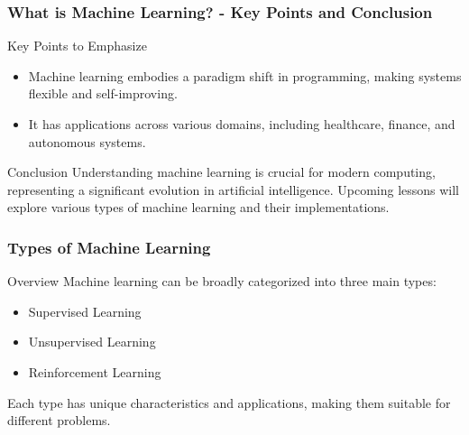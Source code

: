 \documentclass[aspectratio=169]{beamer}
\begin{document}
\begin{frame}[fragile]
    \frametitle{What is Machine Learning? - Key Points and Conclusion}
    \begin{block}{Key Points to Emphasize}
        \begin{itemize}
            \item Machine learning embodies a paradigm shift in programming, making systems flexible and self-improving.
            \item It has applications across various domains, including healthcare, finance, and autonomous systems.
        \end{itemize}
    \end{block}
    
    \begin{block}{Conclusion}
        Understanding machine learning is crucial for modern computing, representing a significant evolution in artificial intelligence. Upcoming lessons will explore various types of machine learning and their implementations.
    \end{block}
\end{frame}

\begin{frame}[fragile]
    \frametitle{Types of Machine Learning}
    \begin{block}{Overview}
        Machine learning can be broadly categorized into three main types:
        \begin{itemize}
            \item Supervised Learning
            \item Unsupervised Learning
            \item Reinforcement Learning
        \end{itemize}
        Each type has unique characteristics and applications, making them suitable for different problems.
    \end{block}
\end{frame}
\end{document}

